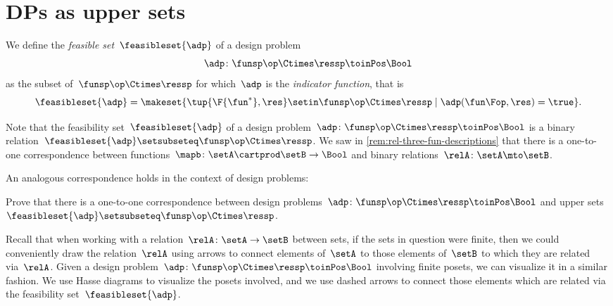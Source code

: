 \section{DPs as upper sets}

\begin{definition}
    \label{def:dp-feasible-set}
    We define the \emph{feasible set}~$\feasibleset{\adp}$ of a design problem
    \begin{equation}
        \label{eq:generic-design-prob}
        \adp\colon \funsp\op \Ctimes \ressp \toinPos \Bool
    \end{equation}
    as the subset of~$\funsp \op\Ctimes \ressp$ for which~$\adp$ is the \emph{indicator function}, that is%
    \begin{equation}
        \label{eq:design-prob-as-upper-set}
        \feasibleset{\adp} = \makeset{ \tup{\F{\fun^*},\res} \setin \funsp \op\Ctimes \ressp  \mid %
            \adp(\fun\Fop, \res) = \true %
        }.
    \end{equation}
\end{definition}

Note that the feasibility set~$\feasibleset{\adp}$ of a design problem~$\adp \colon \funsp \op \Ctimes \ressp\toinPos \Bool$ is a binary relation~$\feasibleset{\adp} \setsubseteq \funsp\op \Ctimes \ressp$.
We saw in \cref{rem:rel-three-fun-descriptions} that there is a one-to-one correspondence between functions~$\mapb \colon \setA \cartprod \setB \to \Bool$ and binary relations~$\relA\colon \setA \mto \setB$.

An analogous correspondence holds in the context of design problems:

\begin{exercise}
    \label{ex:adp-uppersets}
    Prove that there is a one-to-one correspondence between design problems~$\adp \colon \funsp \op \Ctimes \ressp\toinPos \Bool$ and upper sets~$\feasibleset{\adp} \setsubseteq \funsp\op \Ctimes \ressp$.
\end{exercise}
\begin{solution}
    \missingsolution
\end{solution}

Recall that when working with a relation~$\relA \colon \setA \to \setB$ between sets, if the sets in question were finite, then we could conveniently draw the relation~$\relA$ using arrows to connect elements of~$\setA$ to those elements of~$\setB$ to which they are related via~$\relA$.
Given a design problem~$\adp \colon \funsp \op \Ctimes \ressp\toinPos \Bool$ involving finite posets, we can visualize it in a similar fashion.
We use Hasse diagrams to visualize the posets involved, and we use dashed arrows to connect those elements which are related via the feasibility set~$\feasibleset{\adp}$.

